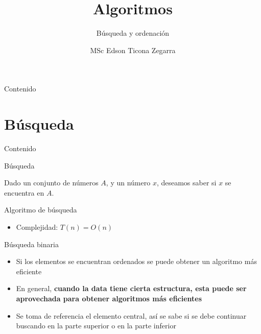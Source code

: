 \documentclass[]{beamer}
\title{Algoritmos}
\subtitle{B\'usqueda y ordenaci\'on}
\author{MSc Edson Ticona Zegarra}
\institute{Campamento de Programaci\'on}
\date{}
\begin{document}
\maketitle

\begin{frame}{Contenido}
\tableofcontents
\end{frame}

\section{B\'usqueda}
\begin{frame}{Contenido}
\tableofcontents[currentsection]
\end{frame}

\begin{frame}{B\'usqueda}
  \begin{definition}
    Dado un conjunto de n\'umeros $A$, y un n\'umero $x$, deseamos saber si $x$
    se encuentra en $A$.
  \end{definition}
\end{frame}

\begin{frame}{Algoritmo de b\'usqueda}
  \begin{algorithm}[H]
    \BlankLine
    {
      {
      }
    }
  \end{algorithm}
  \pause
  \begin{itemize}
    \item Complejidad: \pause $T(n)=O(n)$
  \end{itemize}
\end{frame}

\begin{frame}{B\'usqueda binaria}
  \begin{itemize}
    \item Si los elementos se encuentran ordenados se puede obtener un algoritmo m\'as eficiente
      \pause
    \item En general, \textbf{cuando la data tiene cierta estructura, esta puede ser aprovechada para obtener algoritmos m\'as eficientes}
      \pause
    \item Se toma de referencia el elemento central, as\'i se sabe si se debe continuar buscando en la parte superior o en la parte inferior
  \end{itemize}
\end{frame}
\end{document}
